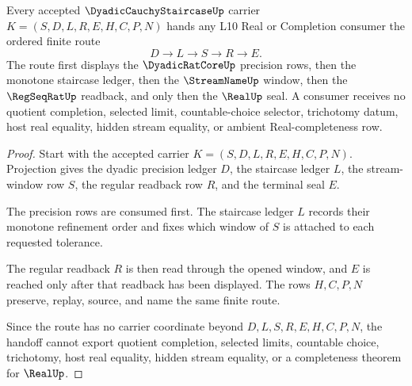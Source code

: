 \begin{theorem}
\label{thm:dyadic-cauchy-staircase-l10-handoff}
Every accepted $\DyadicCauchyStaircaseUp$ carrier $K=(S,D,L,R,E,H,C,P,N)$ hands any L10 Real or Completion consumer the ordered finite route
$$
D \longrightarrow L \longrightarrow S \longrightarrow R \longrightarrow E .
$$
The route first displays the $\DyadicRatCoreUp$ precision rows, then the monotone staircase ledger, then the $\StreamNameUp$ window, then the $\RegSeqRatUp$ readback, and only then the $\RealUp$ seal. A consumer receives no quotient completion, selected limit, countable-choice selector, trichotomy datum, host real equality, hidden stream equality, or ambient Real-completeness row.
\end{theorem}
\begin{proof}
Start with the accepted carrier $K=(S,D,L,R,E,H,C,P,N)$. Projection gives the dyadic precision ledger $D$, the staircase ledger $L$, the stream-window row $S$, the regular readback row $R$, and the terminal seal $E$.

The precision rows are consumed first. The staircase ledger $L$ records their monotone refinement order and fixes which window of $S$ is attached to each requested tolerance.

The regular readback $R$ is then read through the opened window, and $E$ is reached only after that readback has been displayed. The rows $H,C,P,N$ preserve, replay, source, and name the same finite route.

Since the route has no carrier coordinate beyond $D,L,S,R,E,H,C,P,N$, the handoff cannot export quotient completion, selected limits, countable choice, trichotomy, host real equality, hidden stream equality, or a completeness theorem for $\RealUp$.
\end{proof}



